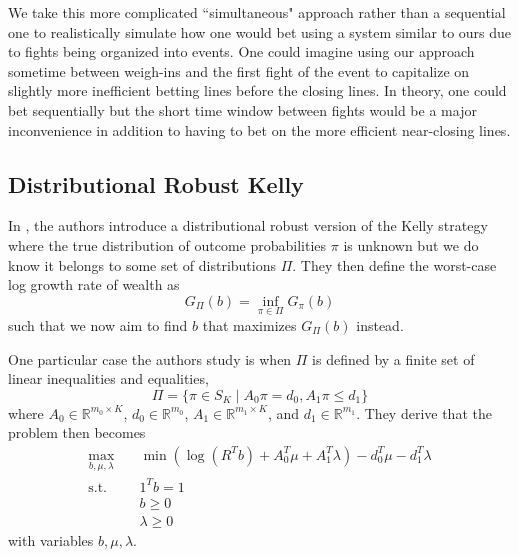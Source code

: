 \documentclass[12pt,twoside]{report}
\begin{document}
We take this more complicated ``simultaneous" approach rather than a sequential one to realistically simulate how one would bet using a system similar to ours due to fights being organized into events. One could imagine using our approach sometime between weigh-ins and the first fight of the event to capitalize on slightly more inefficient betting lines before the closing lines. In theory, one could bet sequentially but the short time window between fights would be a major inconvenience in addition to having to bet on the more efficient near-closing lines.


\subsection{Distributional Robust Kelly}

In \citep{sun_2021}, the authors introduce a distributional robust version of the Kelly strategy where the true distribution of outcome probabilities $\pi$ is unknown but we do know it belongs to some set of distributions $\Pi$. They then define the worst-case log growth rate of wealth as 
$$G_{\Pi}(b) = \inf_{\pi \in \Pi} G_{\pi} (b)$$
such that we now aim to find $b$ that maximizes $G_{\Pi}(b)$ instead.

One particular case the authors study is when $\Pi$ is defined by a finite set of linear inequalities and equalities,
$$\Pi = \{\pi \in S_K \mid A_0 \pi = d_0, A_1 \pi \leq d_1 \}$$
where $A_0 \in \mathbb{R}^{m_0 \times K}$, $d_0 \in \mathbb{R}^{m_0}$, $A_1 \in \mathbb{R}^{m_1 \times K}$, and $d_1 \in \mathbb{R}^{m_1}$. They derive that the problem then becomes
$$\begin{aligned}
    \max_{b, \mu, \lambda} \quad & \min(\log(R^T b) + A_0^T \mu + A_1^T \lambda) - d_0^T \mu - d_1^T \lambda\\
    \textrm{s.t.} \quad & 1^T b = 1 \\
                        & b \geq 0 \\
                        & \lambda \geq 0
\end{aligned}$$
with variables $b, \mu, \lambda$.
\end{document}
